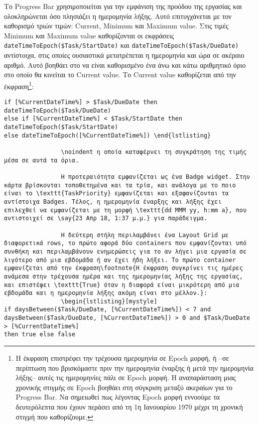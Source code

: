                 Το Progress Bar χρησιμοποιείται για την εμφάνιση της προόδου της εργασίας και ολοκληρώνεται όσο πλησιάζει η ημερομηνία λήξης. Αυτό επιτυγχάνεται με τον καθορισμό τριών τιμών: Current, Minimum και Maximum value. Στις τιμές Minimum και Maximum value καθορίζονται οι εκφράσεις \verb|dateTimeToEpoch($Task/StartDate)| και \verb|dateTimeToEpoch($Task/DueDate)| αντίστοιχα, στις οποίες ουσιαστικά μετατρέπεται η ημερομηνία και ώρα σε ακέραιο αριθμό. Αυτό βοηθάει στο να είναι καθορισμένο ένα άνω και κάτω αριθμητικό όριο στο οποίο θα κινείται το Current value. Το Current value καθορίζεται από την έκφραση\footnote{Η έκφραση επιστρέφει την τρέχουσα ημερομηνία σε Epoch μορφή, ή --σε περίπτωση που βρισκόμαστε πριν την ημερομηνία έναρξης ή μετά την ημερομηνία λήξης-- αυτές τις ημερομηνίες πάλι σε Epoch μορφή. Η αναπαράσταση μιας χρονικής στιγμής σε Epoch βοηθάει στη σύγκριση μεταξύ ακεραίων για το Progress Bar. Να σημειωθεί πως λέγοντας Epoch μορφή εννοούμε τα δευτερόλεπτα που έχουν περάσει από τη 1η Ιανουαρίου 1970 μέχρι τη χρονική στιγμή που καθορίζουμε.}:

                \begin{lstlisting}[mystyle]
if [%CurrentDateTime%] > $Task/DueDate then dateTimeToEpoch($Task/DueDate)
else if [%CurrentDateTime%] < $Task/StartDate then dateTimeToEpoch($Task/StartDate)
else dateTimeToEpoch([%CurrentDateTime%]) \end{lstlisting}

                \noindent η οποία καταφέρνει τη συγκράτηση της τιμής μέσα σε αυτά τα όρια.

                Η προτεραιότητα εμφανίζεται ως ένα Badge widget. Στην κάρτα βρίσκονται τοποθετημένα και τα τρία, και ανάλογα με το ποιο είναι το \texttt{TaskPriority} εμφανίζεται και εξαφανίζονται τα αντίστοιχα Badges. Τέλος, η ημερομηνία έναρξης και λήξης έχει επιλεχθεί να εμφανίζεται με τη μορφή \texttt{dd MMM yy, h:mm a}, που αντιστοιχεί σε \say{23 Απρ 18, 1:37 μ.μ.} για παράδειγμα.

                Η δεύτερη στήλη περιλαμβάνει ένα Layout Grid με διαφορετικά rows, το πρώτο αφορά δύο containers που εμφανίζονται υπό συνθήκη και περιλαμβάνουν ενημερώσεις για το αν λήγει μια εργασία σε λιγότερο από μια εβδομάδα ή αν έχει ήδη λήξει. Το πρώτο container εμφανίζεται από την έκφραση\footnote{Η έκφραση συγκρίνει τις ημέρες ανάμεσα στην τρέχουσα ημέρα και της ημερομηνίας λήξης της εργασίας, και επιστέφει \texttt{True} όταν η διαφορά είναι μικρότερη από μια εβδομάδα και η ημερομηνία λήξης ακόμη είναι στο μέλλον.}:
                \begin{lstlisting}[mystyle]
if daysBetween($Task/DueDate, [%CurrentDateTime%]) < 7 and daysBetween($Task/DueDate, [%CurrentDateTime%]) > 0 and $Task/DueDate > [%CurrentDateTime%]
then true else false \end{lstlisting}

